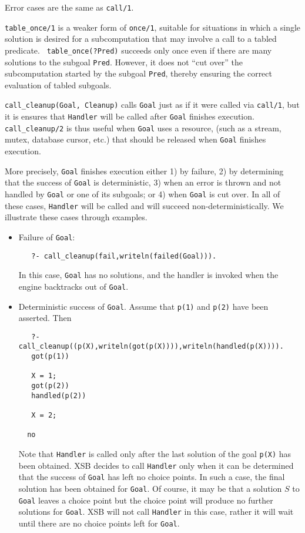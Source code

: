 \begin{description}
    Error cases are the same as {\tt call/1}.

    {\tt table\_once/1} is a weaker form of {\tt once/1}, suitable for
    situations in which a single solution is desired for a
    subcomputation that may involve a call to a tabled predicate.  {\tt
    table\_once(?Pred)} succeeds only once even if there are many
    solutions to the subgoal {\tt Pred}.  However, it does not ``cut
    over'' the subcomputation started by the subgoal {\tt Pred},
    thereby ensuring the correct evaluation of tabled subgoals.

%
{\tt call\_cleanup(Goal, Cleanup)} calls {\tt Goal} just as if it were
called via {\tt call/1}, but it is ensures that {\tt Handler} will be
called after {\tt Goal} finishes execution.  {\tt call\_cleanup/2} is
thus useful when {\tt Goal} uses a resource, (such as a stream, mutex,
database cursor, etc.) that should be released when {\tt Goal}
finishes execution.

More precisely, {\tt Goal} finishes execution either 1) by failure, 2)
by determining that the success of {\tt Goal} is deterministic, 3)
when an error is thrown and not handled by {\tt Goal} or one of its
subgoals; or 4) when {\tt Goal} is cut over.  In all of these cases,
{\tt Handler} will be called and will succeed non-deterministically.
We illustrate these cases through examples.
\begin{itemize}
\item Failure of {\tt Goal}:
\begin{verbatim}
   ?- call_cleanup(fail,writeln(failed(Goal))).
\end{verbatim}
In this case, {\tt Goal} has no solutions, and the handler is invoked
when the engine backtracks out of {\tt Goal}.
%
\item Deterministic success of {\tt Goal}.  Assume that {\tt p(1)} and
  {\tt p(2)} have been asserted.  Then
\begin{verbatim}
   ?- call_cleanup((p(X),writeln(got(p(X)))),writeln(handled(p(X)))).
   got(p(1))

   X = 1;
   got(p(2))
   handled(p(2))

   X = 2;

  no
\end{verbatim}
Note that {\tt Handler} is called only after the last solution of the
goal {\tt p(X)} has been obtained.  XSB decides to call {\tt Handler}
only when it can be determined that the success of {\tt Goal} has left
no choice points.  In such a case, the final solution has been
obtained for {\tt Goal}.  Of course, it may be that a solution $S$ to
{\tt Goal} leaves a choice point but the choice point will produce no
further solutions for {\tt Goal}.  XSB will not call {\tt Handler} in
this case, rather it will wait until there are no choice points left
for {\tt Goal}.


\end{itemize}
\end{description}

